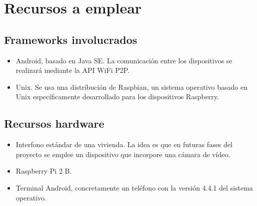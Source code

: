 \chapter{Recursos a emplear}
\label{chap:recursos}
\onehalfspacing

\section{Frameworks involucrados}
\label{sec:frameworksInvolucrados_deRecursos}
\begin{itemize}
	\item Android, basado en Java SE. La comunicación entre los dispositivos se realizará mediante la API WiFi P2P.
	\item Unix. Se usa una distribución de Raspbian, un sistema operativo basado en Unix específicamente desarrollado para los dispositivos Raspberry.
\end{itemize}

\section{Recursos hardware}
\label{sec:recursosHardware_deRecursos}
\begin{itemize}
	\item Interfono estándar de una vivienda. La idea es que en futuras fases del proyecto se emplee un dispositivo que incorpore una cámara de vídeo.
	\item Raspberry Pi 2 B.
	\item Terminal Android, concretamente un teléfono con la versión 4.4.1 del sistema operativo.
\end{itemize}


